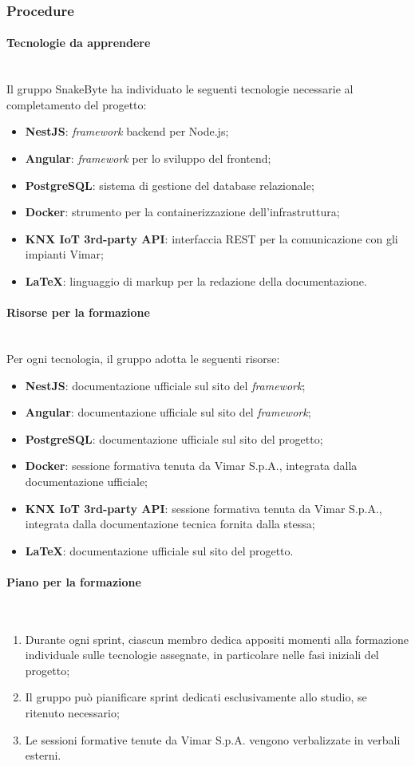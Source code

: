 \documentclass[10pt, letterpaper]{article}
\newcommand{\trisubsection}[1]{\paragraph{#1}\mbox{}\\}
\begin{document}
\subsubsection{Procedure}

\trisubsection{Tecnologie da apprendere}
Il gruppo SnakeByte ha individuato le seguenti tecnologie necessarie al completamento del progetto:
\begin{itemize}
    \item \textbf{NestJS}: \textit{framework} backend per Node.js;
    \item \textbf{Angular}: \textit{framework} per lo sviluppo del frontend;
    \item \textbf{PostgreSQL}: sistema di gestione del database relazionale;
    \item \textbf{Docker}: strumento per la containerizzazione dell'infrastruttura;
    \item \textbf{KNX IoT 3rd-party API}: interfaccia REST per la comunicazione con gli impianti Vimar;
    \item \textbf{\LaTeX}: linguaggio di markup per la redazione della documentazione.
\end{itemize}

\trisubsection{Risorse per la formazione}
Per ogni tecnologia, il gruppo adotta le seguenti risorse:
\begin{itemize}
    \item \textbf{NestJS}: documentazione ufficiale sul sito del \textit{framework};
    \item \textbf{Angular}: documentazione ufficiale sul sito del \textit{framework};
    \item \textbf{PostgreSQL}: documentazione ufficiale sul sito del progetto;
    \item \textbf{Docker}: sessione formativa tenuta da Vimar S.p.A., integrata dalla documentazione ufficiale;
    \item \textbf{KNX IoT 3rd-party API}: sessione formativa tenuta da Vimar S.p.A., integrata dalla documentazione tecnica fornita dalla stessa;
    \item \textbf{\LaTeX}: documentazione ufficiale sul sito del progetto.
\end{itemize}

\trisubsection{Piano per la formazione}
\begin{enumerate}
    \item Durante ogni sprint, ciascun membro dedica appositi momenti alla formazione individuale sulle tecnologie assegnate, in particolare nelle fasi iniziali del progetto;
    \item Il gruppo può pianificare sprint dedicati esclusivamente allo studio, se ritenuto necessario;
    \item Le sessioni formative tenute da Vimar S.p.A. vengono verbalizzate in verbali esterni.
\end{enumerate}
\end{document}
